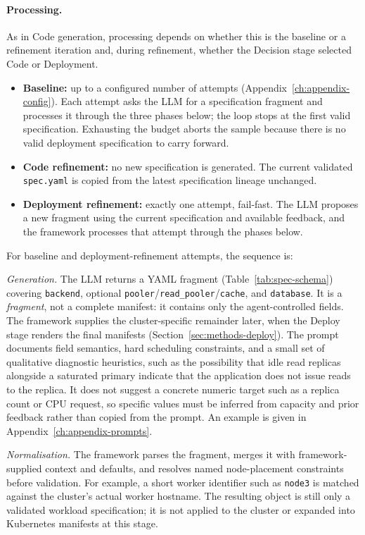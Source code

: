\paragraph{Processing.}
As in Code generation, processing depends on whether this is the baseline or
a refinement iteration and, during refinement, whether the Decision stage
selected Code or Deployment.
\begin{itemize}
  \item \textbf{Baseline:} up to a configured number of attempts
        (Appendix~\ref{ch:appendix-config}). Each attempt asks the LLM for a
        specification fragment and processes it through the three phases
        below; the loop stops at the first valid specification. Exhausting
        the budget aborts the sample because there is no valid deployment
        specification to carry forward.
  \item \textbf{Code refinement:} no new specification is generated. The
        current validated \texttt{spec.yaml} is copied from the latest
        specification lineage unchanged.
  \item \textbf{Deployment refinement:} exactly one attempt, fail-fast. The
        LLM proposes a new fragment using the current specification and
        available feedback, and the framework processes that attempt through
        the phases below.
\end{itemize}
For baseline and deployment-refinement attempts, the sequence is:

\emph{Generation.}
The LLM returns a YAML fragment (Table~\ref{tab:spec-schema}) covering
\texttt{backend}, optional
\texttt{pooler}/\texttt{read\_pooler}/\texttt{cache}, and \texttt{database}.
It is a \emph{fragment}, not a complete manifest: it contains only the
agent-controlled fields. The framework supplies the cluster-specific
remainder later, when the Deploy stage renders the final manifests
(Section~\ref{sec:methods-deploy}). The prompt documents field semantics,
hard scheduling constraints, and a small set of qualitative diagnostic
heuristics, such as the possibility that idle read replicas alongside a
saturated primary indicate that the application does not issue reads to the
replica. It does not suggest a concrete numeric target such as a replica
count or CPU request, so specific values must be inferred from capacity and
prior feedback rather than copied from the prompt. An example is given in
Appendix~\ref{ch:appendix-prompts}.

\smallskip
\emph{Normalisation.}
The framework parses the fragment, merges it with framework-supplied context
and defaults, and resolves named node-placement constraints before
validation. For example, a short worker identifier such as \texttt{node3} is
matched against the cluster's actual worker hostname. The resulting object is
still only a validated workload specification; it is not applied to the
cluster or expanded into Kubernetes manifests at this stage.

